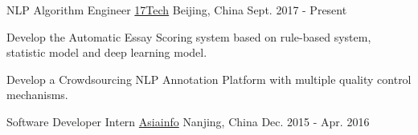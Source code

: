 

\begin{cventries}

  \cventry
    {NLP Algorithm Engineer} %
    {\href{https://www.17zuoye.com/help/aboutus.vpage}{17Tech}} %
    {Beijing, China} %
    {Sept. 2017 - Present} %
    {
      \begin{cvitems} %
        \item {Develop the Automatic Essay Scoring system based on rule-based system, statistic model and deep learning model.}
        \item {Develop a Crowdsourcing NLP Annotation Platform with multiple quality control mechanisms.}
      \end{cvitems}
    }

  \cventry
    {Software Developer Intern} %
    {\href{http://www.asiainfo.com}{Asiainfo}} %
    {Nanjing, China} %
    {Dec. 2015 - Apr. 2016} %
    {
    }


\end{cventries}